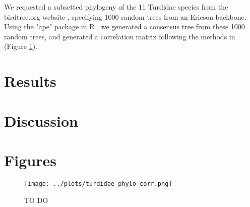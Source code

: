 \documentclass[]{article}
\begin{document}
We requested a subsetted phylogeny of the 11 Turdidae species from the birdtree.org website \citep{jetz_global_nodate}, specifying 1000 random trees from an Ericson backbone. Using the "ape" package in R \citep{paradis_ape_2019}, we generated a consensus tree from these 1000 random trees, and generated a correlation matrix following the methods in \citet{solymos_phylogeny_2018} (Figure \ref{fig:phylo_corr}).

\section{Results}

\section{Discussion}



\section{Figures}

\begin{figure}
	\texttt{[image: ../plots/turdidae\_phylo\_corr.png]}
	\caption{TO DO}
	\label{fig:phylo_corr}
\end{figure}
\end{document}
